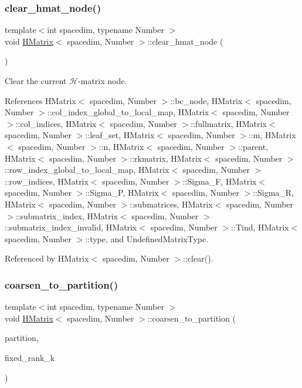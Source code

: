 \subsubsection{\texorpdfstring{clear\+\_\+hmat\+\_\+node()}{clear\_hmat\_node()}}
{\footnotesize\ttfamily template$<$int spacedim, typename Number $>$ \\
void \hyperlink{classHMatrix}{H\+Matrix}$<$ spacedim, Number $>$\+::clear\+\_\+hmat\+\_\+node (\begin{DoxyParamCaption}{ }\end{DoxyParamCaption})}

Clear the current $\mathcal{H}$-\/matrix node. 

References H\+Matrix$<$ spacedim, Number $>$\+::bc\+\_\+node, H\+Matrix$<$ spacedim, Number $>$\+::col\+\_\+index\+\_\+global\+\_\+to\+\_\+local\+\_\+map, H\+Matrix$<$ spacedim, Number $>$\+::col\+\_\+indices, H\+Matrix$<$ spacedim, Number $>$\+::fullmatrix, H\+Matrix$<$ spacedim, Number $>$\+::leaf\+\_\+set, H\+Matrix$<$ spacedim, Number $>$\+::m, H\+Matrix$<$ spacedim, Number $>$\+::n, H\+Matrix$<$ spacedim, Number $>$\+::parent, H\+Matrix$<$ spacedim, Number $>$\+::rkmatrix, H\+Matrix$<$ spacedim, Number $>$\+::row\+\_\+index\+\_\+global\+\_\+to\+\_\+local\+\_\+map, H\+Matrix$<$ spacedim, Number $>$\+::row\+\_\+indices, H\+Matrix$<$ spacedim, Number $>$\+::\+Sigma\+\_\+F, H\+Matrix$<$ spacedim, Number $>$\+::\+Sigma\+\_\+P, H\+Matrix$<$ spacedim, Number $>$\+::\+Sigma\+\_\+R, H\+Matrix$<$ spacedim, Number $>$\+::submatrices, H\+Matrix$<$ spacedim, Number $>$\+::submatrix\+\_\+index, H\+Matrix$<$ spacedim, Number $>$\+::submatrix\+\_\+index\+\_\+invalid, H\+Matrix$<$ spacedim, Number $>$\+::\+Tind, H\+Matrix$<$ spacedim, Number $>$\+::type, and Undefined\+Matrix\+Type.



Referenced by H\+Matrix$<$ spacedim, Number $>$\+::clear().

\mbox{\label{classHMatrix_a525ad4d453f4f496b98cccb341c8b60b}} 
\subsubsection{\texorpdfstring{coarsen\+\_\+to\+\_\+partition()}{coarsen\_to\_partition()}}
{\footnotesize\ttfamily template$<$int spacedim, typename Number $>$ \\
void \hyperlink{classHMatrix}{H\+Matrix}$<$ spacedim, Number $>$\+::coarsen\+\_\+to\+\_\+partition (\begin{DoxyParamCaption}\item[{const std\+::vector$<$ typename \hyperlink{classBlockClusterTree}{Block\+Cluster\+Tree}$<$ spacedim, Number $>$\+::node\+\_\+pointer\+\_\+type $>$ \&}]{partition,  }\item[{const unsigned int}]{fixed\+\_\+rank\+\_\+k }\end{DoxyParamCaption})}

